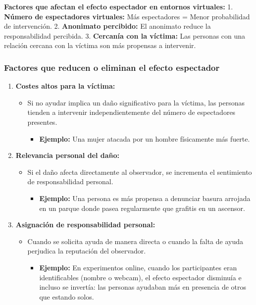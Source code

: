 \documentclass[
]{book}
\providecommand{\tightlist}{%
  \setlength{\itemsep}{0pt}\setlength{\parskip}{0pt}}
\begin{document}
\textbf{Factores que afectan el efecto espectador en entornos virtuales:}
1. \textbf{Número de espectadores virtuales:} Más espectadores = Menor probabilidad de intervención.
2. \textbf{Anonimato percibido:} El anonimato reduce la responsabilidad percibida.
3. \textbf{Cercanía con la víctima:} Las personas con una relación cercana con la víctima son más propensas a intervenir.

\subsubsection{Factores que reducen o eliminan el efecto espectador}\label{factores-que-reducen-o-eliminan-el-efecto-espectador}

\begin{enumerate}
\def\labelenumi{\arabic{enumi}.}
\tightlist
\item
  \textbf{Costes altos para la víctima:}

  \begin{itemize}
  \tightlist
  \item
    Si no ayudar implica un daño significativo para la víctima, las personas tienden a intervenir independientemente del número de espectadores presentes.

    \begin{itemize}
    \tightlist
    \item
      \textbf{Ejemplo:} Una mujer atacada por un hombre físicamente más fuerte.
    \end{itemize}
  \end{itemize}
\item
  \textbf{Relevancia personal del daño:}

  \begin{itemize}
  \tightlist
  \item
    Si el daño afecta directamente al observador, se incrementa el sentimiento de responsabilidad personal.

    \begin{itemize}
    \tightlist
    \item
      \textbf{Ejemplo:} Una persona es más propensa a denunciar basura arrojada en un parque donde pasea regularmente que grafitis en un ascensor.
    \end{itemize}
  \end{itemize}
\item
  \textbf{Asignación de responsabilidad personal:}

  \begin{itemize}
  \tightlist
  \item
    Cuando se solicita ayuda de manera directa o cuando la falta de ayuda perjudica la reputación del observador.

    \begin{itemize}
    \tightlist
    \item
      \textbf{Ejemplo:} En experimentos online, cuando los participantes eran identificables (nombre o webcam), el efecto espectador disminuía e incluso se invertía: las personas ayudaban más en presencia de otros que estando solos.
    \end{itemize}
  \end{itemize}
\end{enumerate}
\end{document}
